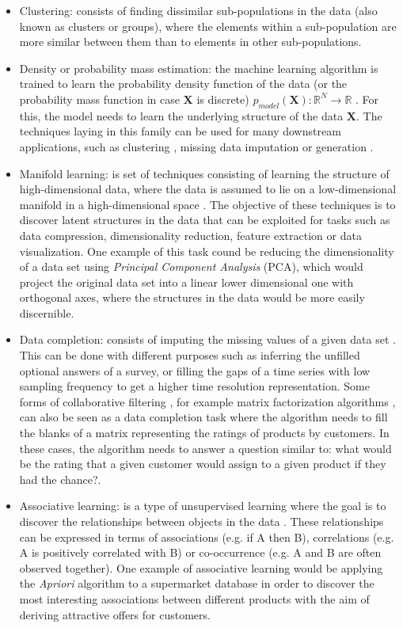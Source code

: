 \begin{itemize}
	\item Clustering: consists of finding dissimilar sub-populations in the data (also known as clusters or groups), where the elements within a sub-population are more similar between them than to elements in other sub-populations.
	\item Density or probability mass estimation: the machine learning algorithm is trained to learn the probability density function of the data (or the probability mass function in case $\mathbf{X}$ is discrete) $p_{model}(\textbf{X}): \mathbb{R}^N \rightarrow \mathbb{R}$ \autocite{Goodfellow2016}. For this, the model needs to learn the underlying structure of the data $\mathbf{X}$. The techniques laying in this family can be used for many downstream applications, such as clustering \autocite{wang2006}, missing data imputation \autocite{qichuan2015} or generation \autocite{liu2020a}.
	\item Manifold learning: is set of techniques consisting of learning the structure of high-dimensional data, where the data is assumed to lie on a low-dimensional manifold in a high-dimensional space \autocite{murphy2012}. The objective of these techniques is to discover latent structures in the data that can be exploited for tasks such as data compression, dimensionality reduction, feature extraction or data visualization. One example of this task cound be reducing the dimensionality of a data set using \textit{Principal Component Analysis} (PCA), which would project the original data set into a linear lower dimensional one with orthogonal axes, where the structures in the data would be more easily discernible.
	\item Data completion: consists of imputing the missing values of a given data set \autocite{vanburen_2018}. This can be done with different purposes such as inferring the unfilled optional answers of a survey, or filling the gaps of a time series with low sampling frequency to get a higher time resolution representation. Some forms of collaborative filtering \autocite{falk2019}, for example matrix factorization algorithms \autocite{koren2009}, can also be seen as a data completion task where the algorithm needs to fill the blanks of a matrix representing the ratings of products by customers. In these cases, the algorithm needs to answer a question similar to: what would be the rating that a given customer would assign to a given product if they had the chance?.
	\item Associative learning:  is a type of unsupervised learning where the goal is to discover the relationships between objects in the data \autocite{zhang2002}. These relationships can be expressed in terms of associations (e.g. if A then B), correlations (e.g. A is positively correlated with B) or co-occurrence (e.g. A and B are often observed together). One example of associative learning would be applying the \textit{Apriori} algorithm \autocite{agrawal1996} to a supermarket database in order to discover the most interesting associations between different products with the aim of deriving attractive offers for customers.

\end{itemize}
